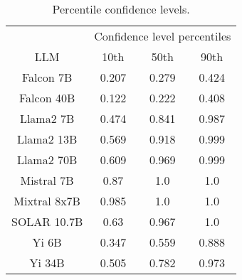 \begin{table*}
\centering
\begin{tabular}{c|c|c|c}
& \multicolumn{3}{c}{Confidence level percentiles} \\ 
LLM & 10th & 50th & 90th\\ \hline
Falcon 7B & 0.207 & 0.279 & 0.424\\
Falcon 40B & 0.122 & 0.222 & 0.408\\
Llama2 7B & 0.474 & 0.841 & 0.987\\
Llama2 13B & 0.569 & 0.918 & 0.999\\
Llama2 70B & 0.609 & 0.969 & 0.999\\
Mistral 7B & 0.87 & 1.0 & 1.0\\
Mixtral 8x7B & 0.985 & 1.0 & 1.0\\
SOLAR 10.7B & 0.63 & 0.967 & 1.0\\
Yi 6B & 0.347 & 0.559 & 0.888\\
Yi 34B & 0.505 & 0.782 & 0.973\\
\hline
\end{tabular}
\caption{Percentile confidence levels.}
\label{tab:percentile_conf}
\end{table*}
